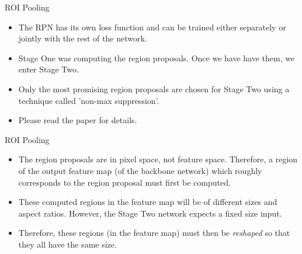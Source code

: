 \begin{frame} {ROI Pooling}
  \begin{itemize}
    \item The RPN has its own loss function and can be trained either separately or jointly with the rest of the network. 
    \item Stage One was computing the region proposals. Once we have have them, we enter Stage Two.
    \item Only the most promising region proposals are chosen for Stage Two using a technique called 'non-max suppression'.
    \item Please read the paper for details.
  \end{itemize}
\end{frame}

\begin{frame} {ROI Pooling}
  \begin{itemize}
    \item The region proposals are in pixel space, not feature space. Therefore, a region of the output feature map (of the backbone network) which roughly corresponds to the region proposal must first be computed.
    \item These computed regions in the feature map will be of different sizes and aspect ratios. However, the Stage Two network expects a fixed size input.
    \item Therefore, these regions (in the feature map) must then be \textit{reshaped} so that they all have the same size.
  \end{itemize}
\end{frame}

